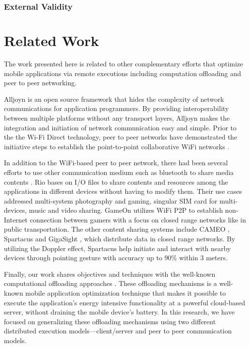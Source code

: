 \documentclass{sig-alternate}[10pt]
\begin{document}
\subsubsection{External Validity}

\section{Related Work}
\label{sec:related}
The work presented here is related to other complementary efforts that optimize mobile applications via remote executions including computation offloading and peer to peer networking.

Alljoyn \cite{alljoyn} is an open source framework that hides the complexity of network communications for application programmers. By providing interoperability between multiple platforms without any transport layers, Alljoyn makes the integration and initiation of network communication easy and simple. Prior to the the Wi-Fi Direct technology, peer to peer networks have demonstrated the initiative steps to establish the point-to-point collaborative WiFi networks \cite{m_p2p_tutor}. 

In addition to the WiFi-based peer to peer network, there had been several efforts to use other communication medium such as bluetooth to share media contents \cite{media_share}. Rio \cite{rio} bases on I/O files to share contents and resources among the applications in different devices without having to modify them. Their use cases addressed multi-system photography and gaming, singular SIM card for multi-devices, music and video sharing. GameOn \cite{gameon} utilizes WiFi P2P to establish non-Internet connection between gamers with a focus on closed range networks like in public transportation. The other content sharing systems include CAMEO \cite{cameo}, Spartacus \cite{spartacus} and GigaSight \cite{crowd-sourcing}, which distribute data in closed range networks. By utilizing the Doppler effect, Spartacus help initiate and interact with nearby devices through pointing gesture with accuracy up to 90\% within 3 meters.

Finally, our work shares objectives and techniques with the well-known computational offloading approaches \cite{maui,comet,mobile-cloud-middleware,fuzzy-engine}. These offloading mechanisms is a well-known mobile application optimization technique that makes it possible to execute the application's energy intensive functionality at a powerful cloud-based server, without draining the mobile device's battery. In this research, we have focused on generalizing these offloading mechanisms using two different distributed execution models---client/server and peer to peer communication models.
\end{document}
